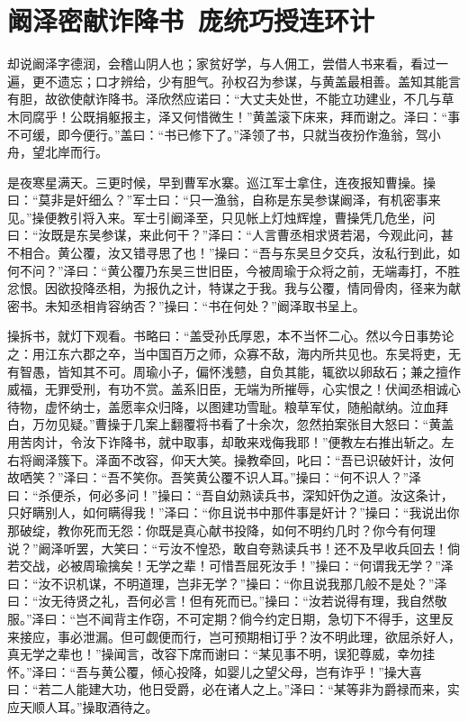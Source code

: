 \chapter{阚泽密献诈降书~庞统巧授连环计}

却说阚泽字德润，会稽山阴人也；家贫好学，与人佣工，尝借人书来看，看过一遍，更不遗忘；口才辨给，少有胆气。孙权召为参谋，与黄盖最相善。盖知其能言有胆，故欲使献诈降书。泽欣然应诺曰：“大丈夫处世，不能立功建业，不几与草木同腐乎！公既捐躯报主，泽又何惜微生！”黄盖滚下床来，拜而谢之。泽曰：“事不可缓，即今便行。”盖曰：“书已修下了。”泽领了书，只就当夜扮作渔翁，驾小舟，望北岸而行。

是夜寒星满天。三更时候，早到曹军水寨。巡江军士拿住，连夜报知曹操。操曰：“莫非是奸细么？”军士曰：“只一渔翁，自称是东吴参谋阚泽，有机密事来见。”操便教引将入来。军士引阚泽至，只见帐上灯烛辉煌，曹操凭几危坐，问曰：“汝既是东吴参谋，来此何干？”泽曰：“人言曹丞相求贤若渴，今观此问，甚不相合。黄公覆，汝又错寻思了也！”操曰：“吾与东吴旦夕交兵，汝私行到此，如何不问？”泽曰：“黄公覆乃东吴三世旧臣，今被周瑜于众将之前，无端毒打，不胜忿恨。因欲投降丞相，为报仇之计，特谋之于我。我与公覆，情同骨肉，径来为献密书。未知丞相肯容纳否？”操曰：“书在何处？”阚泽取书呈上。

操拆书，就灯下观看。书略曰：“盖受孙氏厚恩，本不当怀二心。然以今日事势论之：用江东六郡之卒，当中国百万之师，众寡不敌，海内所共见也。东吴将吏，无有智愚，皆知其不可。周瑜小子，偏怀浅戆，自负其能，辄欲以卵敌石；兼之擅作威福，无罪受刑，有功不赏。盖系旧臣，无端为所摧辱，心实恨之！伏闻丞相诚心待物，虚怀纳士，盖愿率众归降，以图建功雪耻。粮草军仗，随船献纳。泣血拜白，万勿见疑。”曹操于几案上翻覆将书看了十余次，忽然拍案张目大怒曰：“黄盖用苦肉计，令汝下诈降书，就中取事，却敢来戏侮我耶！”便教左右推出斩之。左右将阚泽簇下。泽面不改容，仰天大笑。操教牵回，叱曰：“吾已识破奸计，汝何故哂笑？”泽曰：“吾不笑你。吾笑黄公覆不识人耳。”操曰：“何不识人？”泽曰：“杀便杀，何必多问！”操曰：“吾自幼熟读兵书，深知奸伪之道。汝这条计，只好瞒别人，如何瞒得我！”泽曰：“你且说书中那件事是奸计？”操曰：“我说出你那破绽，教你死而无怨：你既是真心献书投降，如何不明约几时？你今有何理说？”阚泽听罢，大笑曰：“亏汝不惶恐，敢自夸熟读兵书！还不及早收兵回去！倘若交战，必被周瑜擒矣！无学之辈！可惜吾屈死汝手！”操曰：“何谓我无学？”泽曰：“汝不识机谋，不明道理，岂非无学？”操曰：“你且说我那几般不是处？”泽曰：“汝无待贤之礼，吾何必言！但有死而已。”操曰：“汝若说得有理，我自然敬服。”泽曰：“岂不闻背主作窃，不可定期？倘今约定日期，急切下不得手，这里反来接应，事必泄漏。但可觑便而行，岂可预期相订乎？汝不明此理，欲屈杀好人，真无学之辈也！”操闻言，改容下席而谢曰：“某见事不明，误犯尊威，幸勿挂怀。”泽曰：“吾与黄公覆，倾心投降，如婴儿之望父母，岂有诈乎！”操大喜曰：“若二人能建大功，他日受爵，必在诸人之上。”泽曰：“某等非为爵禄而来，实应天顺人耳。”操取酒待之。

